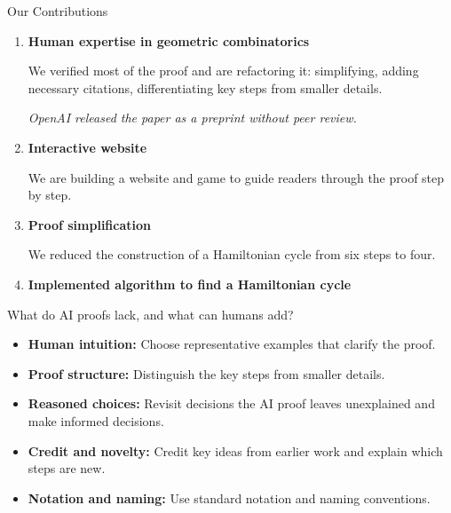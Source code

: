 \documentclass[aspectratio=169,12pt,t]{beamer}
\begin{document}
\begin{frame}[c]{Our Contributions}
  \setlength{\leftmargini}{0.7em}
  \small
  \begin{enumerate}[<+->]
    \setlength{\itemsep}{1.15em}
    \item {\large\bfseries Human expertise in geometric combinatorics}\par
      \vspace{0.15em}
      We verified most of the proof and are refactoring it: simplifying, adding necessary citations, differentiating key steps from smaller details.\par
      {\footnotesize\itshape\color{black!65}
        OpenAI released the paper as a preprint without peer review.\par}
    \item {\large\bfseries Interactive website}\par
      \vspace{0.15em}
      We are building a website and game to guide readers through the proof step by step.
    \item {\large\bfseries Proof simplification}\par
      \vspace{0.15em}
      We reduced the construction of a Hamiltonian cycle from six steps to four.
    \item {\large\bfseries Implemented algorithm to find a Hamiltonian cycle}
  \end{enumerate}
\end{frame}

\begin{frame}[c]{What do AI proofs lack, and what can humans add?}
  \setlength{\leftmargini}{1em}
  \begin{itemize}[<+->]
    \setlength{\itemsep}{0.9em}
    \item \textbf{Human intuition:} Choose representative examples that clarify the proof.
    \item \textbf{Proof structure:} Distinguish the key steps from smaller details.
    \item \textbf{Reasoned choices:} Revisit decisions the AI proof leaves unexplained and make informed decisions.
    \item \textbf{Credit and novelty:} Credit key ideas from earlier work and explain which steps are new.
    \item \textbf{Notation and naming:} Use standard notation and naming conventions.
  \end{itemize}
  \vspace{0.65em}
\end{frame}
\end{document}
